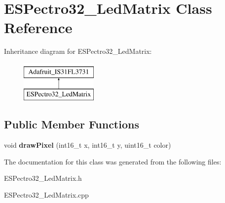 \hypertarget{classESPectro32__LedMatrix}{\section{E\-S\-Pectro32\-\_\-\-Led\-Matrix Class Reference}
\label{classESPectro32__LedMatrix}
}
Inheritance diagram for E\-S\-Pectro32\-\_\-\-Led\-Matrix\-:\begin{figure}[H]
\begin{center}
\leavevmode
\includegraphics[height=2.000000cm]{classESPectro32__LedMatrix}
\end{center}
\end{figure}
\subsection*{Public Member Functions}
\begin{DoxyCompactItemize}
\item 
\hypertarget{classESPectro32__LedMatrix_acc508c724480c3a7a742e8cadfaa74ed}{void {\bfseries draw\-Pixel} (int16\-\_\-t x, int16\-\_\-t y, uint16\-\_\-t color)}\label{classESPectro32__LedMatrix_acc508c724480c3a7a742e8cadfaa74ed}

\end{DoxyCompactItemize}


The documentation for this class was generated from the following files\-:\begin{DoxyCompactItemize}
\item 
E\-S\-Pectro32\-\_\-\-Led\-Matrix.\-h\item 
E\-S\-Pectro32\-\_\-\-Led\-Matrix.\-cpp\end{DoxyCompactItemize}
